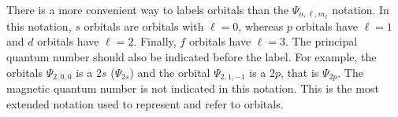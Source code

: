 \documentclass[main.tex]{subfiles}
\newcommand\chapterlabel{electrons}
\begin{document}
\begin{description}
\begin{center}
   \end{center}
\item[\docfilehook{Orbital labels: $s$, $p$, $d$ and $f$}{ }] 
There is a more convenient way to labels orbitals than the $\Psi_{n,\ell, m_{\ell}}$ notation. In this notation, $s$ orbitals are orbitals with $\ell=0$, whereas $p$ orbitals have $\ell=1$ and $d$ orbitals have $\ell=2$. Finally, $f$ orbitals have $\ell=3$. The principal quantum number should also be indicated before the label. For example, the orbitals $\Psi_{2,0, 0}$ is a 2$s$ ($\Psi_{2s}$) and the orbital $\Psi_{2,1, -1}$ is a 2$p$, that is $\Psi_{2p}$. The magnetic quantum number is not indicated in this notation. This is the most extended notation used to represent and refer to orbitals.


\end{description}
\end{document}
